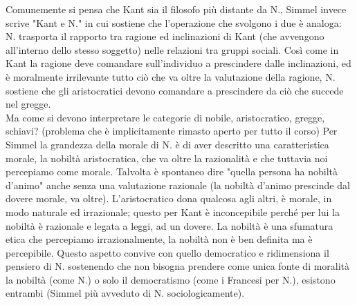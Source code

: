 \documentclass[10pt,a4paper]{article}
\begin{document}
\begin{itemize}
Comunemente si pensa che Kant sia il filosofo più distante da N., Simmel invece scrive "Kant e N." in cui sostiene che l'operazione che svolgono i due è analoga: N. trasporta il rapporto tra ragione ed inclinazioni di Kant (che avvengono all'interno dello stesso soggetto) nelle relazioni tra gruppi sociali. Così come in Kant la ragione deve comandare sull'individuo a prescindere dalle inclinazioni, ed è moralmente irrilevante tutto ciò che va oltre la valutazione della ragione, N. sostiene che gli aristocratici devono comandare a prescindere da ciò che succede nel gregge.\\
Ma come si devono interpretare le categorie di nobile, aristocratico, gregge, schiavi? (problema che è implicitamente rimasto aperto per tutto il corso) Per Simmel la grandezza della morale di N. è di aver descritto una caratteristica morale, la nobiltà aristocratica, che va oltre la razionalità e che tuttavia noi percepiamo come morale. Talvolta è spontaneo dire "quella persona ha nobiltà d'animo" anche senza una valutazione razionale (la nobiltà d'animo prescinde dal dovere morale, va oltre). L'aristocratico dona qualcosa agli altri, è morale, in modo naturale ed irrazionale; questo per Kant è inconcepibile perché per lui la nobiltà è razionale e legata a leggi, ad un dovere. La nobiltà è una sfumatura etica che percepiamo irrazionalmente, la nobiltà non è ben definita ma è percepibile. Questo aspetto convive con quello democratico e ridimensiona il pensiero di N. sostenendo che non bisogna prendere come unica fonte di moralità la nobiltà (come N.) o solo il democratismo (come i Francesi per N.), esistono entrambi (Simmel più avveduto di N. sociologicamente). 

\end{itemize}
\end{document}
